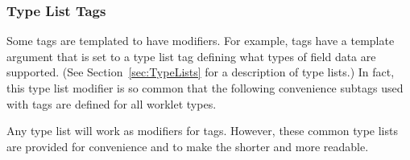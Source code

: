 \subsubsection{Type List Tags}
\label{sec:TypeListTags}


Some tags are templated to have modifiers. For example,
 tags have a template argument that is set to a type
list tag defining what types of field data are supported. (See
Section~\ref{sec:TypeLists} for a description of type lists.) In fact, this
type list modifier is so common that the following convenience subtags used
with  tags are defined for all worklet types.

\begin{didyouknow}
  Any type list will work as modifiers for \controlsignature tags. However,
  these common type lists are provided for convenience and to make the
  \controlsignature shorter and more readable.
\end{didyouknow}

